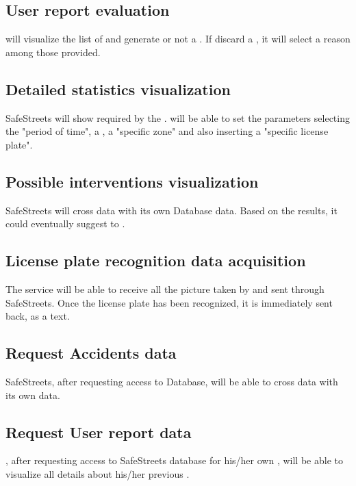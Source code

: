 \documentclass[../../rasd.tex]{subfiles}
\begin{document}
	\subsection{User report evaluation}
	 will visualize the list of  and generate or not a . If  discard a , it will select a reason among those provided.
	
	\subsection{Detailed statistics visualization}
	SafeStreets will show  required by the .  will be able to set the parameters selecting the "period of time", a , a "specific zone" and also inserting a "specific license plate". 
	
	\subsection{Possible interventions visualization}
	SafeStreets will cross   data with its own Database data. Based on the results, it could eventually suggest  to . 
	
	\subsection{License plate recognition data acquisition}
	The service will be able to receive all the picture taken by  and sent through SafeStreets. Once the license plate has been recognized, it is immediately sent back, as a text.
	
	\subsection{Request Accidents data}
	SafeStreets, after requesting access to   Database, will be able to cross  data with its own data. 
	
	\subsection{Request User report data}
	, after requesting access to SafeStreets database for his/her own , will be able to visualize all details about his/her previous . 
	
\end{document}
